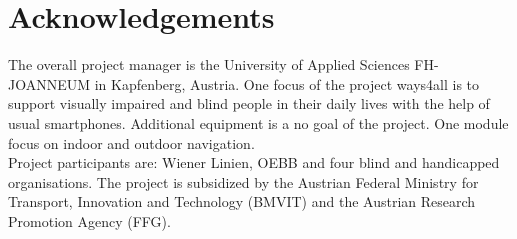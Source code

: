 \documentclass{sig-alternate}
\begin{document}
\section{Acknowledgements}
The overall project manager is the University of Applied Sciences FH-JOANNEUM in Kapfenberg, Austria. One focus of the project ways4all is to support visually impaired and blind people in their daily lives with the help of usual smartphones. Additional equipment is a no goal of the project. One module focus on indoor and outdoor navigation. \\
Project participants are: Wiener Linien, OEBB and four blind and handicapped organisations. The project is subsidized by the Austrian Federal Ministry
for Transport, Innovation and Technology (BMVIT) and the
Austrian Research Promotion Agency (FFG).

%

%
%
\end{document}
